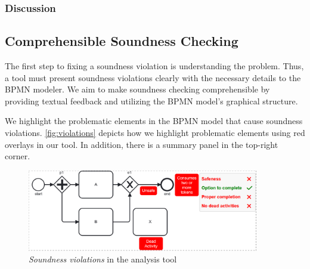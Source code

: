 \documentclass[runningheads]{llncs}
\begin{document}
\subsubsection{Discussion}



\subsection{Comprehensible Soundness Checking}

The first step to fixing a soundness violation is understanding the problem.
Thus, a tool must present soundness violations clearly with the necessary details to the BPMN modeler.
We aim to make soundness checking comprehensible by providing textual feedback and utilizing the BPMN model's graphical structure.

We highlight the problematic elements in the BPMN model that cause soundness violations.
\autoref{fig:violations} depicts how we highlight problematic elements using red overlays in our tool.
In addition, there is a summary panel in the top-right corner.

\begin{figure}[ht]
	\centering
	\includegraphics[width=0.9\textwidth]{images/violations}
	\caption{\textit{Soundness violations} in the analysis tool}
	\label{fig:violations}
\end{figure}
\end{document}
